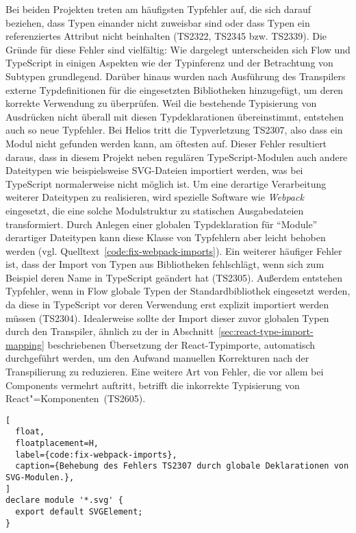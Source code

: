 Bei beiden Projekten treten am häufigsten Typfehler auf, die sich darauf beziehen, dass Typen einander nicht zuweisbar sind oder dass Typen ein referenziertes Attribut nicht beinhalten (TS2322, TS2345 bzw. TS2339). Die Gründe für diese Fehler sind vielfältig: Wie dargelegt unterscheiden sich Flow und TypeScript in einigen Aspekten wie der Typinferenz und der Betrachtung von Subtypen grundlegend. Darüber hinaus wurden nach Ausführung des Transpilers externe Typdefinitionen für die eingesetzten Bibliotheken hinzugefügt, um deren korrekte Verwendung zu überprüfen. Weil die bestehende Typisierung von Ausdrücken nicht überall mit diesen Typdeklarationen übereinstimmt, entstehen auch so neue Typfehler. Bei Helios tritt die Typverletzung TS2307, also dass ein Modul nicht gefunden werden kann, am öftesten auf. Dieser Fehler resultiert daraus, dass in diesem Projekt neben regulären TypeScript-Modulen auch andere Dateitypen wie beispielsweise SVG-Dateien importiert werden, was bei TypeScript normalerweise nicht möglich ist. Um eine derartige Verarbeitung weiterer Dateitypen zu realisieren, wird spezielle Software wie \textit{Webpack}~\autocite{WEBPACK} eingesetzt, die eine solche Modulstruktur zu statischen Ausgabedateien transformiert. Durch Anlegen einer globalen Typdeklaration für \enquote{Module} derartiger Dateitypen kann diese Klasse von Typfehlern aber leicht behoben werden (vgl. Quelltext~\ref{code:fix-webpack-imports}). Ein weiterer häufiger Fehler ist, dass der Import von Typen aus Bibliotheken fehlschlägt, wenn sich zum Beispiel deren Name in TypeScript geändert hat (TS2305). Außerdem entstehen Typfehler, wenn in Flow globale Typen der Standardbibliothek eingesetzt werden, da diese in TypeScript vor deren Verwendung erst explizit importiert werden müssen (TS2304). Idealerweise sollte der Import dieser zuvor globalen Typen durch den Transpiler, ähnlich zu der in Abschnitt~\ref{sec:react-type-import-mapping} beschriebenen Übersetzung der React-Typimporte, automatisch durchgeführt werden, um den Aufwand manuellen Korrekturen nach der Transpilierung zu reduzieren. Eine weitere Art von Fehler, die vor allem bei Components vermehrt auftritt, betrifft die inkorrekte Typisierung von React"=Komponenten~(TS2605).

\begin{lstlisting}[
  float,
  floatplacement=H,
  label={code:fix-webpack-imports},
  caption={Behebung des Fehlers TS2307 durch globale Deklarationen von SVG-Modulen.},
]
declare module '*.svg' {
  export default SVGElement;
}
\end{lstlisting}

